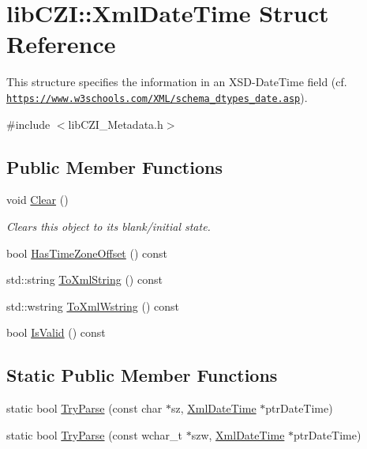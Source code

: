 \hypertarget{structlib_c_z_i_1_1_xml_date_time}{}\section{lib\+C\+ZI\+:\+:Xml\+Date\+Time Struct Reference}
\label{structlib_c_z_i_1_1_xml_date_time}


This structure specifies the information in an X\+S\+D-\/\+Date\+Time field (cf. \href{https://www.w3schools.com/XML/schema_dtypes_date.asp}{\tt https\+://www.\+w3schools.\+com/\+X\+M\+L/schema\+\_\+dtypes\+\_\+date.\+asp}).  




{\ttfamily \#include $<$lib\+C\+Z\+I\+\_\+\+Metadata.\+h$>$}

\subsection*{Public Member Functions}
\begin{DoxyCompactItemize}
\item 
\mbox{\label{structlib_c_z_i_1_1_xml_date_time_a7126c0b68b135306f28514add83fc720}} 
void \hyperlink{structlib_c_z_i_1_1_xml_date_time_a7126c0b68b135306f28514add83fc720}{Clear} ()
\begin{DoxyCompactList}\small\item\em Clears this object to its blank/initial state. \end{DoxyCompactList}\item 
bool \hyperlink{structlib_c_z_i_1_1_xml_date_time_abdd0b4dc181a4825b2eaf97aea58d44d}{Has\+Time\+Zone\+Offset} () const
\item 
std\+::string \hyperlink{structlib_c_z_i_1_1_xml_date_time_a0ecc73d0509f050a291817fd7e4c4e6d}{To\+Xml\+String} () const
\item 
std\+::wstring \hyperlink{structlib_c_z_i_1_1_xml_date_time_a98d5f56db50d7ae8b269dafb18f620a8}{To\+Xml\+Wstring} () const
\item 
bool \hyperlink{structlib_c_z_i_1_1_xml_date_time_a3ecf25b06c3b6e40978e9141a62a9b87}{Is\+Valid} () const
\end{DoxyCompactItemize}
\subsection*{Static Public Member Functions}
\begin{DoxyCompactItemize}
\item 
static bool \hyperlink{structlib_c_z_i_1_1_xml_date_time_acde177dc8ddb80c6e831645a7d2fd276}{Try\+Parse} (const char $\ast$sz, \hyperlink{structlib_c_z_i_1_1_xml_date_time}{Xml\+Date\+Time} $\ast$ptr\+Date\+Time)
\item 
static bool \hyperlink{structlib_c_z_i_1_1_xml_date_time_ae7875a4a64cd9c4fd0906cf27832c0d4}{Try\+Parse} (const wchar\+\_\+t $\ast$szw, \hyperlink{structlib_c_z_i_1_1_xml_date_time}{Xml\+Date\+Time} $\ast$ptr\+Date\+Time)
\end{DoxyCompactItemize}
